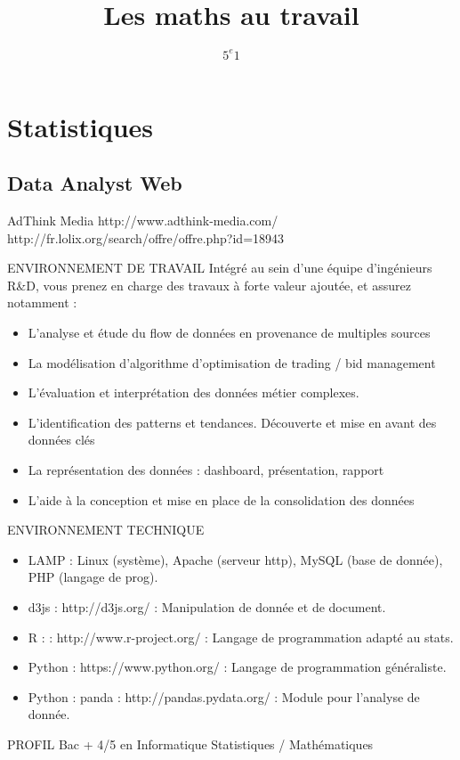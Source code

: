 \documentclass{beamer}
\title{Les maths au travail}
\author{$5^{e}1$}
\begin{document}
\frame{\titlepage}

\section{Statistiques}
\subsection{Data Analyst Web}

\frame{\tableofcontents[sectionstyle=show/shaded, subsectionstyle=show/shaded]}

\begin{frame}

	\begin{alertblock}{AdThink Media}
	http://www.adthink-media.com/\\
	http://fr.lolix.org/search/offre/offre.php?id=18943
	\end{alertblock}
  \begin{block}{ENVIRONNEMENT DE TRAVAIL}	
Intégré au sein d’une équipe d’ingénieurs R\&D, vous prenez en charge des travaux à forte valeur ajoutée, et assurez notamment :

  \begin{itemize}
  \item<2-> L’analyse et étude du flow de données en provenance de multiples sources
  \item<3-> La modélisation d'algorithme d'optimisation de trading / bid management
  \item<4-> L’évaluation et interprétation des données métier complexes. 
  \item<5-> L’identification des patterns et tendances. Découverte et mise en avant des données clés
  \item<6-> La représentation des données : dashboard, présentation, rapport
  \item<7-> L’aide à la conception et mise en place de la consolidation des données
\end{itemize}
  \end{block}
\end{frame}

\begin{frame}
  \begin{block}{ENVIRONNEMENT TECHNIQUE}	
  \begin{itemize}
  \item<1-> LAMP :  Linux (système), Apache (serveur http), MySQL (base de donnée), PHP (langage de prog). 
  \item<2-> d3js : http://d3js.org/ : Manipulation de donnée et de document.
  \item<3-> R : : http://www.r-project.org/ : Langage de programmation adapté au stats.
  \item<4-> Python : https://www.python.org/ : Langage de programmation généraliste.
  \item<5-> Python : panda : http://pandas.pydata.org/ : Module pour l'analyse de donnée.
\end{itemize}
  \end{block}
\end{frame}

\begin{frame}
  \begin{block}{PROFIL}	
Bac + 4/5 en Informatique Statistiques / Mathématiques
  \end{block}
\end{frame}
\end{document}
